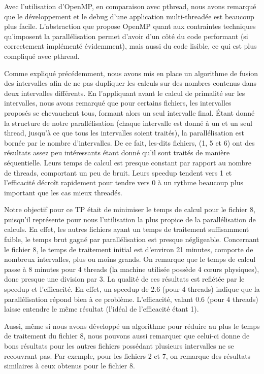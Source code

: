 \documentclass[a4paper, french]{article}
\begin{document}
Avec l'utilisation d'OpenMP, en comparaison avec pthread, nous avons remarqué que le développement
et le debug d'une application multi-threadée est beaucoup plus facile. L'abstraction que propose
OpenMP quant aux contraintes techniques qu'imposent la parallélisation permet d'avoir d'un côté du
code performant (si correctement implémenté évidemment), mais aussi du code lisible, ce qui est plus
compliqué avec pthread. 

Comme expliqué précédemment, nous avons mis en place un algorithme de fusion des intervalles afin de
ne pas dupliquer les calculs sur des nombres contenus dans deux intervalles différents. En
l'appliquant avant le calcul de primalité sur les intervalles, nous avons remarqué que pour certains
fichiers, les intervalles proposés se chevauchent tous, formant alors un seul intervalle final. Étant
donné la structure de notre parallélisation (chaque intervalle est donné à un et un seul thread,
jusqu'à ce que tous les intervalles soient traités), la parallélisation est bornée par le nombre
d'intervalles. De ce fait, les-dits fichiers, (1, 5 et 6) ont des résultats assez peu intéressants
étant donné qu'il sont traités de manière séquentielle. Leurs temps de calcul est presque constant
par rapport au nombre de threads, comportant un peu de bruit. Leurs speedup tendent vers 1 et
l'efficacité décroît rapidement pour tendre vers 0 à un rythme beaucoup plus important que les cas
mieux threadés.

Notre objectif pour ce TP était de minimiser le temps de calcul pour le fichier 8, puisqu'il
représente pour nous l'utilisation la plus propice de la parallélisation de calculs. En effet, les
autres fichiers ayant un temps de traitement suffisamment faible, le temps brut gagné par
parallélisation est presque négligeable. Concernant le fichier 8, le temps de traitement initial est
d'environ 21 minutes, comporte de nombreux intervalles, plus ou moins grands. On remarque que le temps
de calcul passe à 8 minutes pour 4 threads (la machine utilisée possède 4 c\oe urs physiques), donc
presque une division par 3. La qualité de ces résultats est reflétée par le speedup et
l'efficacité. En effet, un speedup de 2.6 (pour 4 threads) indique que la parallélisation répond
bien à ce problème. L'efficacité, valant 0.6 (pour 4 threads) laisse entendre le même résultat
(l'idéal de l'efficacité étant 1). 

Aussi, même si nous avons développé un algorithme pour réduire au plus le temps de traitement du
fichier 8, nous pouvons aussi remarquer que celui-ci donne de bons résultats pour les autres
fichiers possédant plusieurs intervalles ne se recouvrant pas. Par exemple, pour les fichiers 2 et 7, on remarque des résultats
similaires à ceux obtenus pour le fichier 8.
\end{document}
